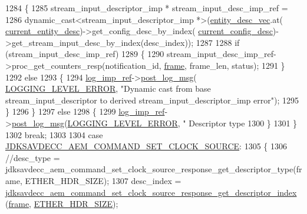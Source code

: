 \begin{DoxyCode}
{{1284         \{
1285             stream\_input\_descriptor\_imp * stream\_input\_desc\_imp\_ref =
1286                 \textcolor{keyword}{dynamic\_cast<}stream\_input\_descriptor\_imp *\textcolor{keyword}{>}(\hyperlink{classavdecc__lib_1_1end__station__imp_a72edab41bc56e3c1757944a7df188a3d}{entity\_desc\_vec}.at(
      \hyperlink{classavdecc__lib_1_1end__station__imp_afd78c89df26ba7641e1adb764c0e827d}{current\_entity\_desc})->get\_config\_desc\_by\_index(
      \hyperlink{classavdecc__lib_1_1end__station__imp_a60b1af40d35e8a86b0082c54ab6cb6a8}{current\_config\_desc})->get\_stream\_input\_desc\_by\_index(desc\_index));
1287 
1288             \textcolor{keywordflow}{if} (stream\_input\_desc\_imp\_ref)
1289             \{
1290                 stream\_input\_desc\_imp\_ref->proc\_get\_counters\_resp(notification\_id, 
      \hyperlink{gst__avb__playbin_8c_ac8e710e0b5e994c0545d75d69868c6f0}{frame}, frame\_len, status);
1291             \}
1292             \textcolor{keywordflow}{else}
1293             \{
1294                 \hyperlink{namespaceavdecc__lib_acbe3e2a96ae6524943ca532c87a28529}{log\_imp\_ref}->\hyperlink{classavdecc__lib_1_1log_a68139a6297697e4ccebf36ccfd02e44a}{post\_log\_msg}(
      \hyperlink{namespaceavdecc__lib_a501055c431e6872ef46f252ad13f85cdaf2c4481208273451a6f5c7bb9770ec8a}{LOGGING\_LEVEL\_ERROR}, \textcolor{stringliteral}{"Dynamic cast from base stream\_input\_descriptor to derived
       stream\_input\_descriptor\_imp error"});
1295             \}
1296         \}
1297         \textcolor{keywordflow}{else}
1298         \{
1299             \hyperlink{namespaceavdecc__lib_acbe3e2a96ae6524943ca532c87a28529}{log\_imp\_ref}->\hyperlink{classavdecc__lib_1_1log_a68139a6297697e4ccebf36ccfd02e44a}{post\_log\_msg}(\hyperlink{namespaceavdecc__lib_a501055c431e6872ef46f252ad13f85cdaf2c4481208273451a6f5c7bb9770ec8a}{LOGGING\_LEVEL\_ERROR}, \textcolor{stringliteral}{"
      Descriptor type %
1300         \}
1301     \}
1302     \textcolor{keywordflow}{break};
1303 
1304     \textcolor{keywordflow}{case} \hyperlink{group__command_ga058084a4e98b48f84b00c96f56130622}{JDKSAVDECC\_AEM\_COMMAND\_SET\_CLOCK\_SOURCE}:
1305     \{
1306         \textcolor{comment}{//desc\_type = jdksavdecc\_aem\_command\_set\_clock\_source\_response\_get\_descriptor\_type(frame,
       ETHER\_HDR\_SIZE);}
1307         desc\_index = 
      \hyperlink{group__command__set__clock__source__response_gafece94c6286479a3c806d3997c73f3d5}{jdksavdecc\_aem\_command\_set\_clock\_source\_response\_get\_descriptor\_index}
      (\hyperlink{gst__avb__playbin_8c_ac8e710e0b5e994c0545d75d69868c6f0}{frame}, \hyperlink{namespaceavdecc__lib_a6c827b1a0d973e18119c5e3da518e65ca9512ad9b34302ba7048d88197e0a2dc0}{ETHER\_HDR\_SIZE});
}}}
\end{DoxyCode}
